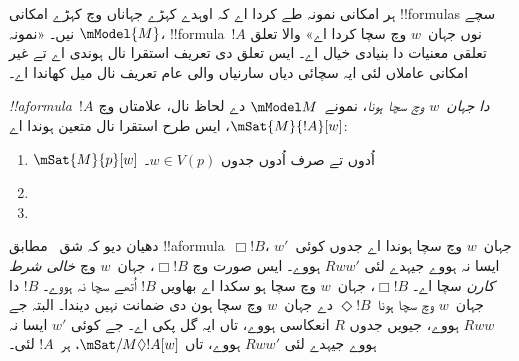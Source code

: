 \documentclass[../../../include/open-logic-section]{subfiles}
\begin{document}


ہر امکانی نمونہ طے کردا اے کہ اوہدے کہڑے جہاناں وچ کہڑے امکانی !!{formula}s سچے نیں۔ «نمونہ $\mModel{M}$، !!{formula}~$!A$ نوں جہان~$w$ وچ سچا کردا اے» والا تعلق تعلقی معنیات دا بنیادی خیال اے۔ ایس تعلق دی تعریف استقرا نال ہوندی اے تے غیر امکانی عاملاں لئی ایہ سچائی دیاں سارنیاں والی عام تعریف نال میل کھاندا اے۔

\begin{defn}
  \emph{!!a{formula}~$!A$ دا جہان~$w$ وچ سچا ہونا}، نمونے~$\mModel M$ دے لحاظ نال، علامتاں وچ $\mSat{M}{!A}[w]$، ایس طرح استقرا نال متعین ہوندا اے:
  \begin{enumerate}
  \item $\mSat{M}{p}[w]$ اُدوں تے صرف اُدوں جدوں $w \in V(p)$۔
  \item{}
  \item{}
  \end{enumerate}
\end{defn}

دھیان دیو کہ شق~ مطابق !!a{formula}~$\Box
!B$، جہان~$w$ وچ سچا ہوندا اے جدوں کوئی~$w'$ ایسا نہ ہووے جیہدے لئی $Rww'$ ہووے۔ ایس صورت وچ $\Box !B$، جہان~$w$ وچ \emph{خالی شرط کارن} سچا اے۔ $\Box !B$، جہان~$w$ وچ سچا ہو سکدا اے بھاویں $!B$ اُتھے سچا نہ ہووے۔ $!B$ دا جہان~$w$ وچ سچا ہونا~$\Diamond !B$ دے جہان~$w$ وچ سچا ہون دی ضمانت نہیں دیندا۔ البتہ جے $Rww$ ہووے، جیویں جدوں $R$ انعکاسی ہووے، تاں ایہ گل پکی اے۔ جے کوئی $w'$ ایسا نہ ہووے جیہدے لئی $Rww'$ ہووے، تاں $\mSat/{M}{\Diamond !A}[w]$، ہر~$!A$ لئی۔
\end{document}

